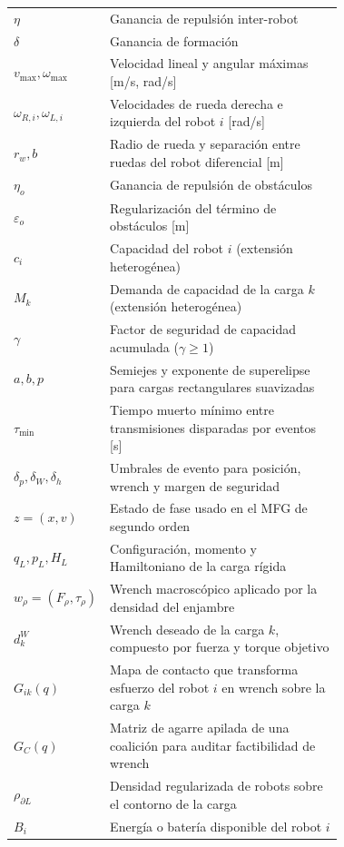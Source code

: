 \begin{longtable}{@{}l@{\hskip 2em}>{\raggedright\arraybackslash}p{0.72\linewidth}@{}}
$\eta$                  & Ganancia de repulsión inter-robot \\
$\delta$                & Ganancia de formación \\
$v_{\max},\omega_{\max}$ & Velocidad lineal y angular máximas [m/s, rad/s] \\
$\omega_{R,i},\omega_{L,i}$ & Velocidades de rueda derecha e izquierda del robot $i$ [rad/s] \\
$r_w,b$                 & Radio de rueda y separación entre ruedas del robot diferencial [m] \\
$\eta_o$                & Ganancia de repulsión de obstáculos \\
$\varepsilon_o$         & Regularización del término de obstáculos [m] \\
$c_i$                   & Capacidad del robot $i$ (extensión heterogénea) \\
$M_k$                   & Demanda de capacidad de la carga $k$ (extensión heterogénea) \\
$\gamma$                & Factor de seguridad de capacidad acumulada ($\gamma\geq1$) \\
$a,b,p$                 & Semiejes y exponente de superelipse para cargas rectangulares suavizadas \\
$\tau_{\min}$           & Tiempo muerto mínimo entre transmisiones disparadas por eventos [s] \\
$\delta_p,\delta_W,\delta_h$ & Umbrales de evento para posición, wrench y margen de seguridad \\
$z=(x,v)$               & Estado de fase usado en el MFG de segundo orden \\
$q_L,p_L,H_L$           & Configuración, momento y Hamiltoniano de la carga rígida \\
$w_\rho=(F_\rho,\tau_\rho)$ & Wrench macroscópico aplicado por la densidad del enjambre \\
$d_k^W$                 & Wrench deseado de la carga $k$, compuesto por fuerza y torque objetivo \\
$G_{ik}(q)$             & Mapa de contacto que transforma esfuerzo del robot $i$ en wrench sobre la carga $k$ \\
$G_C(q)$                & Matriz de agarre apilada de una coalición para auditar factibilidad de wrench \\
$\rho_{\partial L}$     & Densidad regularizada de robots sobre el contorno de la carga \\
$B_i$                   & Energía o batería disponible del robot $i$ \\

\end{longtable}
